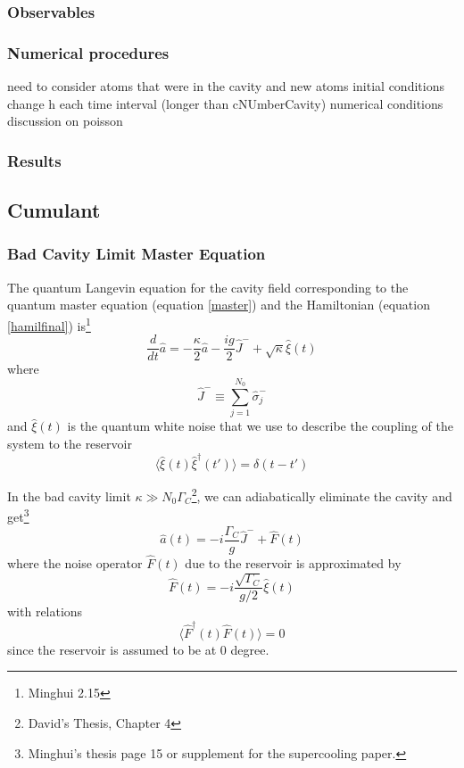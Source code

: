 \documentclass{article}
\newcommand{\gc}{\Gamma_C}
\begin{document}
\subsubsection{Observables}
\subsubsection{Numerical procedures}
need to consider atoms that were in the cavity and new atoms
initial conditions
change h each time interval (longer than cNUmberCavity)
numerical conditions
discussion on poisson
\subsubsection{Results}

\subsection{Cumulant}
\subsubsection{Bad Cavity Limit Master Equation}
The quantum Langevin equation for the cavity field corresponding to the quantum master equation (equation \ref{master}) and the Hamiltonian (equation \ref{hamilfinal}) is\footnote{Minghui 2.15}
\begin{equation}
\frac{d}{dt}\hat{a}=-\frac{\kappa}{2}\hat{a}-\frac{ig}{2}\hat{J}^-+\sqrt{\kappa}\hat{\xi}(t)
\end{equation}
where 
\begin{equation}
\hat{J}^-\equiv\sum_{j=1}^{N_0}\hat{\sigma}_j^-
\end{equation}
and $\hat{\xi}(t)$ is the quantum white noise that we use to describe the coupling of the system to the reservoir
\begin{equation}
    \langle\hat{\xi}(t)\hat{\xi}^\dagger(t')\rangle = \delta(t-t')
\end{equation}

In the bad cavity limit $\kappa \gg N_0 \gc$\footnote{David's Thesis, Chapter 4}, we can adiabatically eliminate the cavity and get\footnote{Minghui's thesis page 15 or supplement for the supercooling paper.}
\begin{equation}
\label{aelim}
\hat{a}(t)=-i\frac{\gc}{g}\hat{J}^-+\hat{F}(t)
\end{equation}
where the noise operator $\hat{F}(t)$ due to the reservoir is approximated by 
\begin{equation}
\hat{F}(t)=-i\frac{\sqrt{\gc}}{g/2}\hat{\xi}(t)
\end{equation}
with relations
\begin{equation}
\label{ff+}
    \langle \hat{F}^\dagger(t)\hat{F}(t)\rangle = 0
\end{equation}
since the reservoir is assumed to be at $0$ degree.
\end{document}
